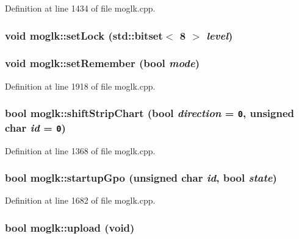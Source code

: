 Definition at line 1434 of file moglk.cpp.\hypertarget{classmoglk_a9d4351888605654a20b9d3e46160ce3}{
\subsubsection[{setLock}]{\setlength{\rightskip}{0pt plus 5cm}void moglk::setLock (std::bitset$<$ 8 $>$ {\em level})}}
\label{classmoglk_a9d4351888605654a20b9d3e46160ce3}


\hypertarget{classmoglk_a56976ce3e35fc312c11488a6c08cfdc}{
\subsubsection[{setRemember}]{\setlength{\rightskip}{0pt plus 5cm}void moglk::setRemember (bool {\em mode})}}
\label{classmoglk_a56976ce3e35fc312c11488a6c08cfdc}




Definition at line 1918 of file moglk.cpp.\hypertarget{classmoglk_0092806e3cf33100936dd48cc1bbe1ae}{
\subsubsection[{shiftStripChart}]{\setlength{\rightskip}{0pt plus 5cm}bool moglk::shiftStripChart (bool {\em direction} = {\tt 0}, \/  unsigned char {\em id} = {\tt 0})}}
\label{classmoglk_0092806e3cf33100936dd48cc1bbe1ae}




Definition at line 1368 of file moglk.cpp.\hypertarget{classmoglk_b5a54b14d6bb193873f2309474778849}{
\subsubsection[{startupGpo}]{\setlength{\rightskip}{0pt plus 5cm}bool moglk::startupGpo (unsigned char {\em id}, \/  bool {\em state})}}
\label{classmoglk_b5a54b14d6bb193873f2309474778849}




Definition at line 1682 of file moglk.cpp.\hypertarget{classmoglk_a133809f7d934231f03f1d59fbc88f75}{
\subsubsection[{upload}]{\setlength{\rightskip}{0pt plus 5cm}bool moglk::upload (void)}}
\label{classmoglk_a133809f7d934231f03f1d59fbc88f75}




